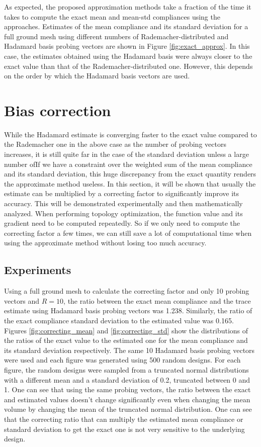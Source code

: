 As expected, the proposed approximation methods take a fraction of the time it takes to compute the exact mean and mean-std compliances using the approaches. Estimates of the mean compliance and its standard deviation for a full ground mesh using different numbers of Rademacher-distributed and Hadamard basis probing vectors are shown in Figure \ref{fig:exact_approx}. In this case, the estimates obtained using the Hadamard basis were always closer to the exact value than that of the Rademacher-distributed one. However, this depends on the order by which the Hadamard basis vectors are used.

\section{Bias correction}

While the Hadamard estimate is converging faster to the exact value compared to the Rademacher one in the above case as the number of probing vectors increases, it is still quite far in the case of the standard deviation unless a large number ofIf we have a constraint over the weighted sum of the mean compliance and its standard deviation, this huge discrepancy from the exact quantity renders the approximate method useless. In this section, it will be shown that usually the estimate can be multiplied by a correcting factor to significantly improve its accuracy. This will be demonstrated experimentally and then mathematically analyzed. When performing topology optimization, the function value and its gradient need to be computed repeatedly. So if we only need to compute the correcting factor a few times, we can still save a lot of computational time when using the approximate method without losing too much accuracy.

\subsection{Experiments}

Using a full ground mesh to calculate the correcting factor and only 10 probing vectors and $R = 10$, the ratio between the exact mean compliance and the trace estimate using Hadamard basis probing vectors was 1.238. Similarly, the ratio of the exact compliance standard deviation to the estimated value was 0.165. Figures \ref{fig:correcting_mean} and \ref{fig:correcting_std} show the distributions of the ratios of the exact value to the estimated one for the mean compliance and its standard deviation respectively. The same 10 Hadamard basis probing vectors were used and each figure was generated using 500 random designs. For each figure, the random designs were sampled from a truncated normal distributions with a different mean and a standard deviation of 0.2, truncated between 0 and 1. One can see that using the same probing vectors, the ratio between the exact and estimated values doesn't change significantly even when changing the mean volume by changing the mean of the truncated normal distribution. One can see that the correcting ratio that can multiply the estimated mean compliance or standard deviation to get the exact one is not very sensitive to the underlying design.

